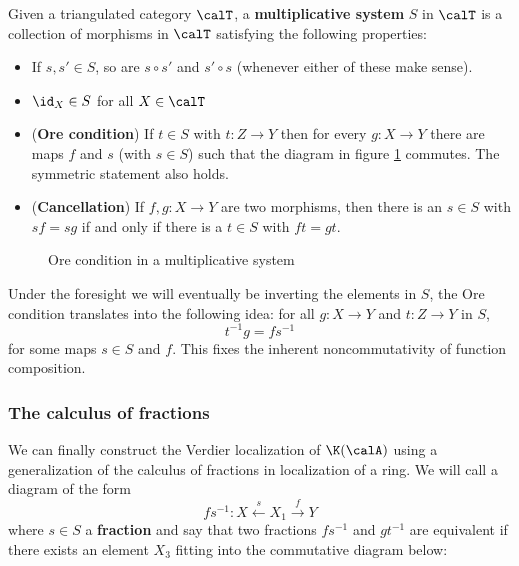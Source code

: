 \documentclass[12pt]{article}
\begin{document}
\begin{defn}
	Given a triangulated category $\calT$, a \textbf{multiplicative system} $S$ in $\calT$ is a collection of morphisms 
	in $\calT$ satisfying the following properties:
	\begin{itemize}
		\item If $s,s'\in S$, so are $s\circ s'$ and $s'\circ s$ (whenever either of these make sense).
		\item $\id_X\in S$ for all $X\in\calT$
		\item (\textbf{Ore condition}) If $t\in S$ with $t:Z\to Y$ then for every $g:X\to Y$ there are maps $f$ and $s$ (with $s\in S$) such that the diagram in figure \ref{fig:fractions} commutes. The symmetric statement also holds.
		\item (\textbf{Cancellation}) If $f,g:X\to Y$ are two morphisms, then there is an $s\in S$ with $sf=sg$ if and only if there is a $t\in S$ with $ft=gt$.
	\end{itemize}
\end{defn}
\begin{figure}
	\centering
	\caption{Ore condition in a multiplicative system}
	\label{fig:fractions}
\end{figure}
\begin{rmk}
	Under the foresight we will eventually be inverting the elements in $S$, the Ore condition translates into the following idea: for all $g:X\to Y$ and $t:Z\to Y$ in $S$,
	\[t^{-1}g=fs^{-1}\]
	for some maps $s\in S$ and $f$. This fixes the inherent noncommutativity of function composition.
\end{rmk}
\subsubsection{The calculus of fractions}
We can finally construct the Verdier localization of $\K(\calA)$ using a generalization of the calculus of 
fractions in localization of a ring. We will call a diagram of the form 
\[fs^{-1}:X\xleftarrow{s} X_1\xrightarrow{f} Y\]
where $s\in S$ a \textbf{fraction} and say that two fractions $fs^{-1}$ and $gt^{-1}$ are equivalent if there exists an element $X_3$ fitting 
into the commutative diagram below:
\begin{center}
\end{center}
\end{document}
